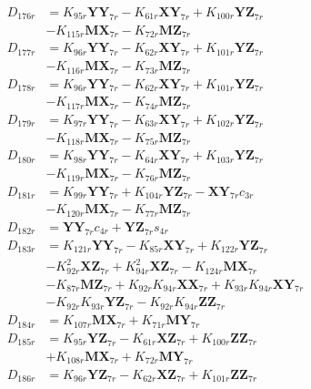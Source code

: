 \begin{align}
D_{176r} &= K_{95r}\mathbf{YY}_{7r} - K_{61r}\mathbf{XY}_{7r} + K_{100r}\mathbf{YZ}_{7r}  \nonumber \\
&- K_{115r}\mathbf{MX}_{7r} - K_{72r}\mathbf{MZ}_{7r} \nonumber \\
D_{177r} &= K_{96r}\mathbf{YY}_{7r} - K_{62r}\mathbf{XY}_{7r} + K_{101r}\mathbf{YZ}_{7r}  \nonumber \\
&- K_{116r}\mathbf{MX}_{7r} - K_{73r}\mathbf{MZ}_{7r} \nonumber \\
D_{178r} &= K_{96r}\mathbf{YY}_{7r} - K_{62r}\mathbf{XY}_{7r} + K_{101r}\mathbf{YZ}_{7r}  \nonumber \\
&- K_{117r}\mathbf{MX}_{7r} - K_{74r}\mathbf{MZ}_{7r} \nonumber \\
D_{179r} &= K_{97r}\mathbf{YY}_{7r} - K_{63r}\mathbf{XY}_{7r} + K_{102r}\mathbf{YZ}_{7r}  \nonumber \\
&- K_{118r}\mathbf{MX}_{7r} - K_{75r}\mathbf{MZ}_{7r} \nonumber \\
D_{180r} &= K_{98r}\mathbf{YY}_{7r} - K_{64r}\mathbf{XY}_{7r} + K_{103r}\mathbf{YZ}_{7r}  \nonumber \\
&- K_{119r}\mathbf{MX}_{7r} - K_{76r}\mathbf{MZ}_{7r} \nonumber \\
D_{181r} &= K_{99r}\mathbf{YY}_{7r} + K_{104r}\mathbf{YZ}_{7r} - \mathbf{XY}_{7r}c_{3r}  \nonumber \\
&- K_{120r}\mathbf{MX}_{7r} - K_{77r}\mathbf{MZ}_{7r} \nonumber \\
D_{182r} &= \mathbf{YY}_{7r}c_{4r} + \mathbf{YZ}_{7r}s_{4r} \nonumber \\
D_{183r} &= K_{121r}\mathbf{YY}_{7r} - K_{85r}\mathbf{XY}_{7r} + K_{122r}\mathbf{YZ}_{7r}  \nonumber \\
&- K_{92r}^2\mathbf{XZ}_{7r} + K_{94r}^2\mathbf{XZ}_{7r} - K_{124r}\mathbf{MX}_{7r}  \nonumber \\
&- K_{87r}\mathbf{MZ}_{7r} + K_{92r}K_{94r}\mathbf{XX}_{7r} + K_{93r}K_{94r}\mathbf{XY}_{7r}  \nonumber \\
&- K_{92r}K_{93r}\mathbf{YZ}_{7r} - K_{92r}K_{94r}\mathbf{ZZ}_{7r} \nonumber \\
D_{184r} &= K_{107r}\mathbf{MX}_{7r} + K_{71r}\mathbf{MY}_{7r} \nonumber \\
D_{185r} &= K_{95r}\mathbf{YZ}_{7r} - K_{61r}\mathbf{XZ}_{7r} + K_{100r}\mathbf{ZZ}_{7r}  \nonumber \\
&+ K_{108r}\mathbf{MX}_{7r} + K_{72r}\mathbf{MY}_{7r} \nonumber \\
D_{186r} &= K_{96r}\mathbf{YZ}_{7r} - K_{62r}\mathbf{XZ}_{7r} + K_{101r}\mathbf{ZZ}_{7r}  \nonumber \\

\end{align}
